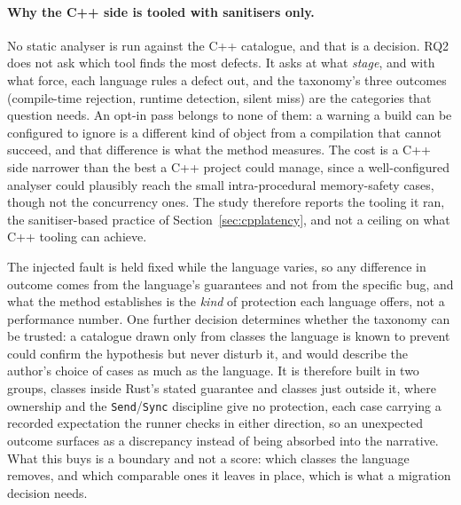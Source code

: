 \paragraph{Why the C++ side is tooled with sanitisers only.}
No static analyser is run against the C++ catalogue, and that is a decision. RQ2 does not ask
which tool finds the most defects. It asks at what \emph{stage}, and with what force, each
language rules a defect out, and the taxonomy's three outcomes (compile-time rejection, runtime
detection, silent miss) are the categories that question needs. An opt-in pass belongs to none
of them: a warning a build can be configured to ignore is a different kind of object from a
compilation that cannot succeed, and that difference is what the method measures. The cost is a
C++ side narrower than the best a C++ project could manage, since a well-configured analyser
could plausibly reach the small intra-procedural memory-safety cases, though not the concurrency
ones. The study therefore reports the tooling it ran, the sanitiser-based practice of
Section~\ref{sec:cpplatency}, and not a ceiling on what C++ tooling can achieve.

The injected fault is held fixed while the language varies, so any difference in outcome comes
from the language's guarantees and not from the specific bug, and what the method establishes is
the \emph{kind} of protection each language offers, not a performance number. One further
decision determines whether the taxonomy can be trusted: a catalogue drawn only from classes the
language is known to prevent could confirm the hypothesis but never disturb it, and would
describe the author's choice of cases as much as the language. It is therefore built in two
groups, classes inside Rust's stated guarantee and classes just outside it, where ownership and
the \texttt{Send}/\texttt{Sync} discipline give no protection, each case carrying a recorded
expectation the runner checks in either direction, so an unexpected outcome surfaces as a
discrepancy instead of being absorbed into the narrative. What this buys is a boundary and not a
score: which classes the language removes, and which comparable ones it leaves in place, which
is what a migration decision needs.

